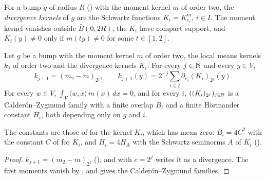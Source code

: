 \begin{definition}
\label{def:bump-divergence-kernels}
\leanok
{}
For a bump $g$ of radius $R$ () with the moment kernel $m$ of order two,
the \emph{divergence kernels} of $g$ are the Schwartz functions $K_i = K^m_{e_i}$, $i \in I$. The
moment kernel vanishes outside $\bar B(0, 2R)$, the $K_i$ have compact support, and
$K_i(y) \neq 0$ only if $m(t y) \neq 0$ for some $t \in [1, 2]$.
\end{definition}

\begin{lemma}
\label{lem:bump-divergence-identity}
\leanok
{}
Let $g$ be a bump with the moment kernel $m$ of order two, the local means kernels $k_j$ of order
two and the divergence kernels $K_i$. For every $j \in \mathbb{N}$ and every $y \in V$,
\[
  k_{j+1} = (m_2 - m)_{2^j} , \qquad
  k_{j+1}(y) = 2^{-j} \sum_{i \in I} \partial_{e_i} (K_i)_{2^j}(y) .
\]
For every $w \in V$, $\int_V \langle w, x \rangle \, m(x) \, dx = 0$, and for every $i$,
$((K_i)_{2^j})_{j \in \mathbb{N}}$ is a Calder\'on--Zygmund family with a finite overlap $B_i$ and a
finite H\"ormander constant $H_i$, both depending only on $g$ and $i$.
\end{lemma}

The constants are those of  for the kernel $K_i$, which has mean
zero: $B_i = 4 C^2$ with the constant $C$ of  for $K_i$, and
$H_i = 4 H_A$ with the Schwartz seminorms $A$ of $K_i$ ().

\begin{proof}
\leanok
$k_{j+1} = (m_2 - m)_{2^j}$ (), and
 with $c = 2^j$ writes it as a divergence. The first moments
vanish by , and  gives the
Calder\'on--Zygmund families.
\end{proof}

